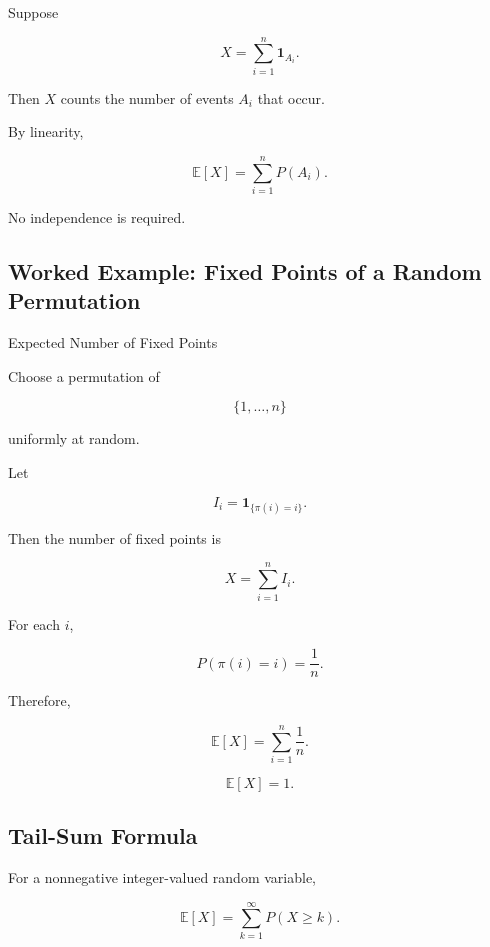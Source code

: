 Suppose

\[
X
=
\sum_{i=1}^{n}
\mathbf{1}_{A_i}.
\]

Then \(X\) counts the number of events \(A_i\) that occur.

By linearity,

\[
\boxed{
\mathbb{E}[X]
=
\sum_{i=1}^{n}
P(A_i).
}
\]

No independence is required.

\subsection{Worked Example: Fixed Points of a Random Permutation}
\label{subsec:worked-fixed-points-expectation}

\begin{workedexamplebox}{Expected Number of Fixed Points}

Choose a permutation of

\[
\{1,\ldots,n\}
\]

uniformly at random.

Let

\[
I_i
=
\mathbf{1}_{\{\pi(i)=i\}}.
\]

Then the number of fixed points is

\[
X
=
\sum_{i=1}^{n}I_i.
\]

For each \(i\),

\[
P(\pi(i)=i)
=
\frac1n.
\]

Therefore,

\[
\mathbb{E}[X]
=
\sum_{i=1}^{n}
\frac1n.
\]

\begin{answerbox}
\[
\boxed{
\mathbb{E}[X]=1.
}
\]
\end{answerbox}

\end{workedexamplebox}

\subsection{Tail-Sum Formula}
\label{subsec:tail-sum-formula}

For a nonnegative integer-valued random variable,

\[
\boxed{
\mathbb{E}[X]
=
\sum_{k=1}^{\infty}
P(X\geq k).
}
\]


